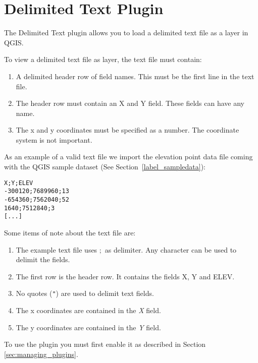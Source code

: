 
\section{Delimited Text Plugin}\label{label_dltext}    


The Delimited Text plugin allows you to load a delimited text file as a layer in QGIS. 


To view a delimited text file as layer, the text file must contain:

\begin{enumerate}      
\item A delimited header row of field names. This must be the first line in the text file.
\item The header row must contain an X and Y field. These fields can have any name.
\item The x and y coordinates must be specified as a number. The coordinate system is not important.
\end{enumerate}

As an example of a valid text file we import the elevation point data file 
 coming with the QGIS sample dataset (See Section~\ref{label_sampledata}):

\begin{verbatim} 
X;Y;ELEV
-300120;7689960;13
-654360;7562040;52
1640;7512840;3
[...]
\end{verbatim}

Some items of note about the text file are:

\begin{enumerate}
\item The example text file uses \mbox{$;$} as delimiter. Any character can be 
used to delimit the fields.
\item The first row is the header row. It contains the fields X, Y and ELEV.
\item No quotes ({\tt{}"{}}) are used to delimit text fields.
\item The x coordinates are contained in the {\em X} field.
\item The y coordinates are contained in the {\em Y} field.
\end{enumerate}

To use the plugin you must first enable it as described in Section 
\ref{sec:managing_plugins}.

